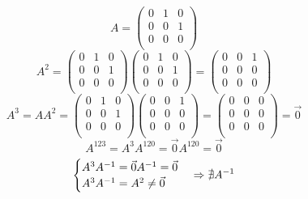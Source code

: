\begin{example}
  $$
    A=
    \begin{pmatrix}
      0 & 1 & 0 \\
      0 & 0 & 1 \\
      0 & 0 & 0 \\
    \end{pmatrix}
  $$
  $$
    A^2=
    \begin{pmatrix}
      0 & 1 & 0 \\
      0 & 0 & 1 \\
      0 & 0 & 0 \\
    \end{pmatrix}
    \begin{pmatrix}
      0 & 1 & 0 \\
      0 & 0 & 1 \\
      0 & 0 & 0 \\
    \end{pmatrix}
    =
    \begin{pmatrix}
      0 & 0 & 1 \\
      0 & 0 & 0 \\
      0 & 0 & 0 \\
    \end{pmatrix}
  $$
  $$
    A^3=AA^2=
    \begin{pmatrix}
      0 & 1 & 0 \\
      0 & 0 & 1 \\
      0 & 0 & 0 \\
    \end{pmatrix}
    \begin{pmatrix}
      0 & 0 & 1 \\
      0 & 0 & 0 \\
      0 & 0 & 0 \\
    \end{pmatrix}
    =
    \begin{pmatrix}
      0 & 0 & 0 \\
      0 & 0 & 0 \\
      0 & 0 & 0 \\
    \end{pmatrix}
    =\vec{0}$$
  $$A^{123}=A^3A^{120}=\vec{0}A^{120}=\vec{0}$$
  $$
    \begin{cases}
      A^3A^{-1}=\vec{0}A^{-1}=\vec{0} \\
      A^3A^{-1}=A^2\neq\vec{0}        \\
    \end{cases}
    \Rightarrow
    \nexists A^{-1}
  $$
\end{example}

